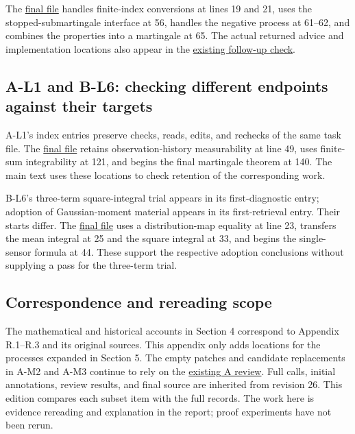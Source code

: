 The \href{research/final_sources/acceptance/r2-m1-b/technical/saved-sources/ProbabilityTheory/chapter_13/thm_13_17.lean}{final file} handles finite-index conversions at lines 19 and 21, uses the stopped-submartingale interface at 56, handles the negative process at 61–62, and combines the properties into a martingale at 65. The actual returned advice and implementation locations also appear in the \href{research/semantic/review_B_addendum.json}{existing follow-up check}.

\subsection[A-L1 and B-L6: checking different endpoints against their targets]{\texorpdfstring{\protect\hypertarget{t3}{}A-L1 and B-L6: checking different endpoints against their targets}{A-L1 and B-L6: checking different endpoints against their targets}}
A-L1's index entries preserve checks, reads, edits, and rechecks of the same task file. The \href{research/final_sources/acceptance/r2-l1-a/technical/saved-sources/ProbabilityTheory/chapter_13/prob_13_9.lean}{final file} retains observation-history measurability at line 49, uses finite-sum integrability at 121, and begins the final martingale theorem at 140. The main text uses these locations to check retention of the corresponding work.

B-L6's three-term square-integral trial appears in its first-diagnostic entry; adoption of Gaussian-moment material appears in its first-retrieval entry. Their starts differ. The \href{research/final_sources/acceptance/r2-l6-b/technical/saved-sources/ProbabilityTheory/chapter_12/prob_12_5.lean}{final file} uses a distribution-map equality at line 23, transfers the mean integral at 25 and the square integral at 33, and begins the single-sensor formula at 44. These support the respective adoption conclusions without supplying a pass for the three-term trial.

\subsection[Correspondence and rereading scope]{\texorpdfstring{\protect\hypertarget{t4}{}Correspondence and rereading scope}{Correspondence and rereading scope}}
The mathematical and historical accounts in Section 4 correspond to Appendix R.1–R.3 and its original sources. This appendix only adds locations for the processes expanded in Section 5. The empty patches and candidate replacements in A-M2 and A-M3 continue to rely on the \href{research/semantic/review_A.json}{existing A review}. Full calls, initial annotations, review results, and final source are inherited from revision 26. This edition compares each subset item with the full records. The work here is evidence rereading and explanation in the report; proof experiments have not been rerun.

